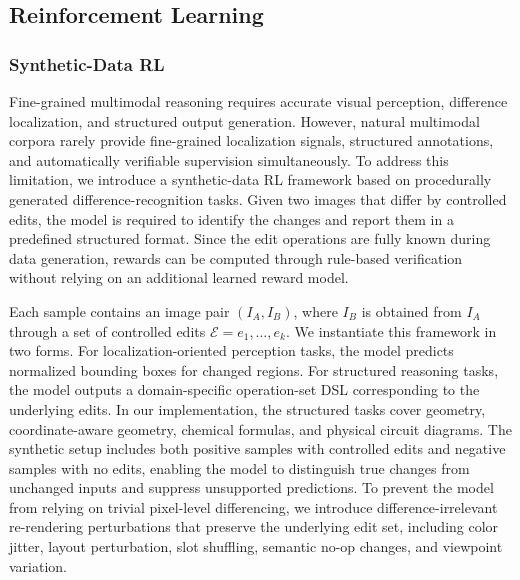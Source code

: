 \documentclass{llmxive}
\begin{document}
\subsection{Reinforcement Learning}

\subsubsection{Synthetic-Data RL}
\label{sec:synthetic-data-rl}

Fine-grained multimodal reasoning requires accurate visual perception, difference localization, and structured output generation. However, natural multimodal corpora rarely provide fine-grained localization signals, structured annotations, and automatically verifiable supervision simultaneously. To address this limitation, we introduce a synthetic-data RL framework based on procedurally generated difference-recognition tasks. Given two images that differ by controlled edits, the model is required to identify the changes and report them in a predefined structured format. Since the edit operations are fully known during data generation, rewards can be computed through rule-based verification without relying on an additional learned reward model.


Each sample contains an image pair $(I_A, I_B)$, where $I_B$ is obtained from $I_A$ through a set of controlled edits $\mathcal{E}={e_1,\ldots,e_k}$. We instantiate this framework in two forms. For localization-oriented perception tasks, the model predicts normalized bounding boxes for changed regions. For structured reasoning tasks, the model outputs a domain-specific operation-set DSL corresponding to the underlying edits. In our implementation, the structured tasks cover geometry, coordinate-aware geometry, chemical formulas, and physical circuit diagrams. The synthetic setup includes both positive samples with controlled edits and negative samples with no edits, enabling the model to distinguish true changes from unchanged inputs and suppress unsupported predictions. To prevent the model from relying on trivial pixel-level differencing, we introduce difference-irrelevant re-rendering perturbations that preserve the underlying edit set, including color jitter, layout perturbation, slot shuffling, semantic no-op changes, and viewpoint variation.
\end{document}
